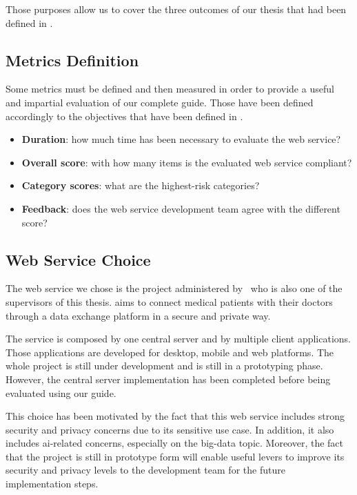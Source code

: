 Those purposes allow us to cover the three outcomes of our thesis that had been defined in .

\subsection{Metrics Definition}
\label{subsec:use_methodology_metrics}

Some metrics must be defined and then measured in order to provide a useful and impartial evaluation of our complete guide. Those have been defined accordingly to the objectives that have been defined in .
\begin{itemize}
	\item \textbf{Duration}: how much time has been necessary to evaluate the web service?
	\item \textbf{Overall score}: with how many items is the evaluated web service compliant?
	\item \textbf{Category scores}: what are the highest-risk categories? 
	\item \textbf{Feedback}: does the web service development team agree with the different score?
\end{itemize}

\subsection{Web Service Choice}
\label{subsec:use_methodology_service}

The web service we chose is the  project administered by \SupervisorOne\ who is also one of the supervisors of this thesis.  aims to connect medical patients with their doctors through a data exchange platform in a secure and private way.

The service is composed by one central server and by multiple client applications. Those applications are developed for desktop, mobile and web platforms. The whole project is still under development and is still in a prototyping phase. However, the central server implementation has been completed before being evaluated using our guide.

This choice has been motivated by the fact that this web service includes strong security and privacy concerns due to its sensitive use case. In addition, it also includes \gls{ai}-related concerns, especially on the \gls{big-data} topic. Moreover, the fact that the project is still in prototype form will enable useful levers to improve its security and privacy levels to the development team for the future implementation steps.

